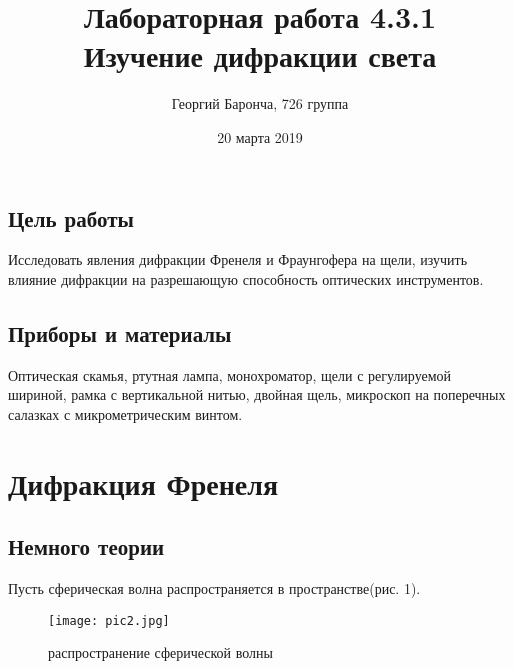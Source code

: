 \documentclass[12pt]{article}
\author{Георгий Баронча, 726 группа}
\title{\textbf{Лабораторная работа 4.3.1 }\\				
Изучение дифракции света}
\date{20 марта 2019}
\begin{document}
	\maketitle
	\subsection{Цель работы}
	 Исследовать явления дифракции Френеля и Фраунгофера на щели, изучить влияние дифракции на разрешающую способность оптических инструментов.
	\subsection{Приборы и материалы}
	Оптическая скамья, ртутная лампа, монохроматор, щели с регулируемой шириной, рамка с вертикальной нитью, двойная щель, микроскоп на поперечных салазках с микрометрическим винтом.
\section{Дифракция Френеля}
\subsection{Немного теории}
	 Пусть сферическая волна распространяется в пространстве(рис. 1).
	 \begin{figure}[h]
	 	\centering	
	 	\texttt{[image: pic2.jpg]}
	 	\caption{распространение сферической волны}
	 \end{figure}\\
	 
\end{document}
